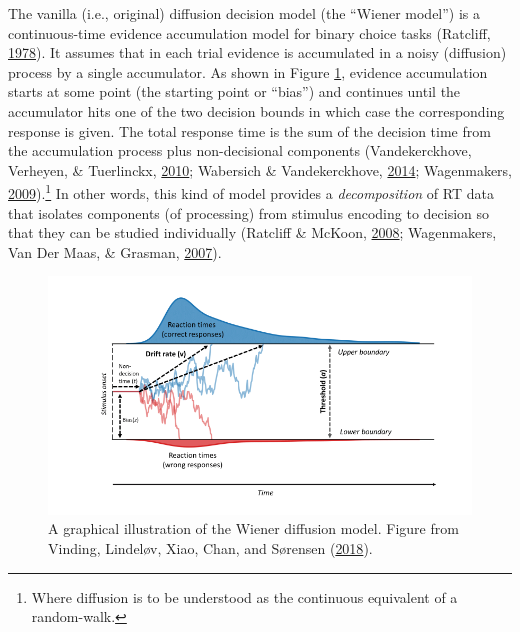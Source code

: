 \documentclass[
  11pt,
  english,
  ,doc,floatsintext]{apa6}
\begin{document}
The vanilla (i.e., original) diffusion decision model (the \enquote{Wiener model}) is a continuous-time evidence accumulation model for binary choice tasks (Ratcliff, \protect\hyperlink{ref-ratcliff_theory_1978}{1978}). It assumes that in each trial evidence is accumulated in a noisy (diffusion) process by a single accumulator. As shown in Figure \ref{fig:wiener-figure}, evidence accumulation starts at some point (the starting point or \enquote{bias}) and continues until the accumulator hits one of the two decision bounds in which case the corresponding response is given. The total response time is the sum of the decision time from the accumulation process plus non-decisional components (Vandekerckhove, Verheyen, \& Tuerlinckx, \protect\hyperlink{ref-vandekerckhove_crossed_2010}{2010}; Wabersich \& Vandekerckhove, \protect\hyperlink{ref-wabersich_rwiener_2014}{2014}; Wagenmakers, \protect\hyperlink{ref-wagenmakers_methodological_2009-1}{2009}).\footnote{Where diffusion is to be understood as the continuous equivalent of a random-walk.} In other words, this kind of model provides a \emph{decomposition} of RT data that isolates components (of processing) from stimulus encoding to decision so that they can be studied individually (Ratcliff \& McKoon, \protect\hyperlink{ref-ratcliff_diffusion_2008}{2008}; Wagenmakers, Van Der Maas, \& Grasman, \protect\hyperlink{ref-wagenmakers_ez-diffusion_2007}{2007}).



\begin{figure}[!htb]

{\centering \includegraphics[width=0.75\linewidth]{figures/wiener_figure} 

}

\caption{A graphical illustration of the Wiener diffusion model. Figure from Vinding, Lindeløv, Xiao, Chan, and Sørensen (\protect\hyperlink{ref-vinding_volition_2018}{2018}).}\label{fig:wiener-figure}
\end{figure}
\end{document}
